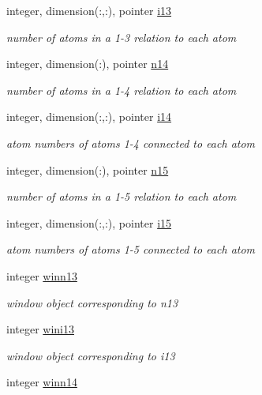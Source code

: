 \begin{DoxyCompactItemize}
integer, dimension(\-:,\-:), pointer \hyperlink{classcouple_a9b19aea8f00763cc5b1c18a7b5de63d1}{i13}
\begin{DoxyCompactList}\small\item\em number of atoms in a 1-\/3 relation to each atom \end{DoxyCompactList}\item 
integer, dimension(\-:), pointer \hyperlink{classcouple_af2d96c50be5d9f3e7acb2f9dbd162f9b}{n14}
\begin{DoxyCompactList}\small\item\em number of atoms in a 1-\/4 relation to each atom \end{DoxyCompactList}\item 
integer, dimension(\-:,\-:), pointer \hyperlink{classcouple_a6774efb08882de858d0b9487266ea2b3}{i14}
\begin{DoxyCompactList}\small\item\em atom numbers of atoms 1-\/4 connected to each atom \end{DoxyCompactList}\item 
integer, dimension(\-:), pointer \hyperlink{classcouple_a5ea066288de09e972ebe72bc0b5a5bb6}{n15}
\begin{DoxyCompactList}\small\item\em number of atoms in a 1-\/5 relation to each atom \end{DoxyCompactList}\item 
integer, dimension(\-:,\-:), pointer \hyperlink{classcouple_a01bb6634975b896380ca729756015a11}{i15}
\begin{DoxyCompactList}\small\item\em atom numbers of atoms 1-\/5 connected to each atom \end{DoxyCompactList}\item 
integer \hyperlink{classcouple_ab5821431c72ea00070b906b8cd377e74}{winn13}
\begin{DoxyCompactList}\small\item\em window object corresponding to n13 \end{DoxyCompactList}\item 
integer \hyperlink{classcouple_af7960f868acfdd2695e93554d2c7d13c}{wini13}
\begin{DoxyCompactList}\small\item\em window object corresponding to i13 \end{DoxyCompactList}\item 
integer \hyperlink{classcouple_a71b4ea717f4034101cc98261cfcf2685}{winn14}

\end{DoxyCompactItemize}
